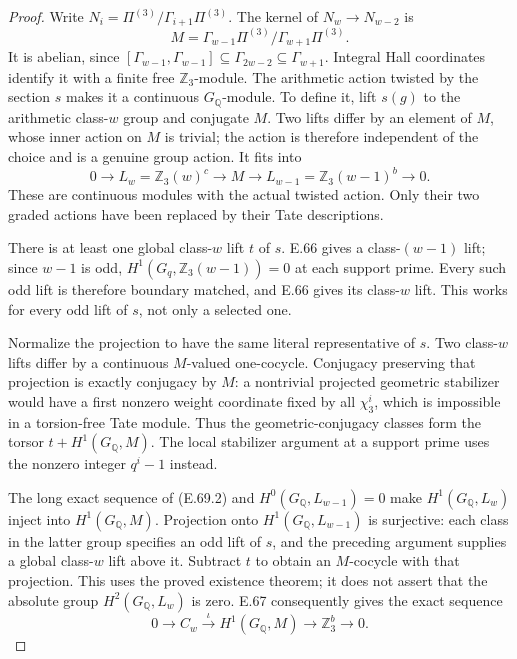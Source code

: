 \begin{proof}
Write $N_i=\Pi^{(3)}/\Gamma_{i+1}\Pi^{(3)}$.
The kernel of $N_w\to N_{w-2}$ is
\[
 M=\Gamma_{w-1}\Pi^{(3)}/\Gamma_{w+1}\Pi^{(3)}.
\]
It is abelian, since
$[\Gamma_{w-1},\Gamma_{w-1}]
\subseteq\Gamma_{2w-2}\subseteq\Gamma_{w+1}$.
Integral Hall coordinates identify it with a
finite free $\mathbb Z_3$-module.
The arithmetic action twisted by the section
$s$ makes it a continuous $G_{\mathbb Q}$-module.
To define it, lift $s(g)$ to the arithmetic
class-$w$ group and conjugate $M$.
Two lifts differ by an element of $M$, whose
inner action on $M$ is trivial; the action is
therefore independent of the choice and is
a genuine group action. It fits into
\[
 0\longrightarrow L_w=\mathbb Z_3(w)^c
   \longrightarrow M
   \longrightarrow L_{w-1}=\mathbb Z_3(w-1)^b
   \longrightarrow0 .
 \tag{E.69.2}
\]
These are continuous modules with the actual
twisted action. Only their two graded actions
have been replaced by their Tate descriptions.

There is at least one global class-$w$ lift
$t$ of $s$. E.66 gives a class-$(w-1)$
lift; since $w-1$ is odd,
$H^1(G_q,\mathbb Z_3(w-1))=0$ at each
support prime. Every such odd lift is
therefore boundary matched, and E.66 gives
its class-$w$ lift. This works for every
odd lift of $s$, not only a selected one.

Normalize the projection to have the same
literal representative of $s$. Two class-$w$
lifts differ by a continuous $M$-valued
one-cocycle. Conjugacy preserving that
projection is exactly conjugacy by $M$:
a nontrivial projected geometric stabilizer
would have a first nonzero weight coordinate
fixed by all $\chi_3^i$, which is impossible
in a torsion-free Tate module.
Thus the geometric-conjugacy classes form
the torsor $t+H^1(G_{\mathbb Q},M)$.
The local stabilizer argument at a support
prime uses the nonzero integer $q^i-1$
instead.

The long exact sequence of (E.69.2) and
$H^0(G_{\mathbb Q},L_{w-1})=0$ make
$H^1(G_{\mathbb Q},L_w)$ inject into
$H^1(G_{\mathbb Q},M)$.
Projection onto $H^1(G_{\mathbb Q},L_{w-1})$
is surjective: each class in the latter
group specifies an odd lift of $s$, and
the preceding argument supplies a global
class-$w$ lift above it. Subtract $t$ to
obtain an $M$-cocycle with that projection.
This uses the proved existence theorem;
it does not assert that the absolute group
$H^2(G_{\mathbb Q},L_w)$ is zero.
E.67 consequently gives the exact sequence
\[
 0\longrightarrow C_w
 \xrightarrow{\ \iota\ } H^1(G_{\mathbb Q},M)
 \longrightarrow\mathbb Z_3^b
 \longrightarrow0 .
 \tag{E.69.3}
\]


\end{proof}
